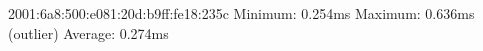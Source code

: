 2001:6a8:500:e081:20d:b9ff:fe18:235c
Minimum: 0.254ms
Maximum: 0.636ms (outlier)
Average: 0.274ms


